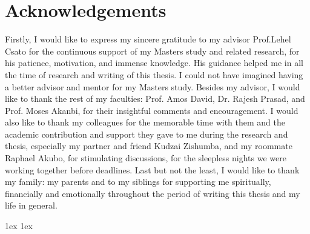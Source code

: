 \documentclass[final,book]{aust_thesis}
\begin{document}
\chapter*{Acknowledgements}%
\thispagestyle{empty}%
Firstly, I would like to express my sincere gratitude to my advisor Prof.Lehel Csato for the continuous support of my Masters study and related research, for his patience, motivation, and immense knowledge. His guidance helped me in all the time of research and writing of this thesis. I could not have imagined having a better advisor and mentor for my Masters study.
Besides my advisor, I would like to thank the rest of my faculties: Prof. Amos David, Dr. Rajesh Prasad, and Prof. Moses Akanbi, for their insightful comments and encouragement.
I would also like to thank my colleagues for the memorable time with them and the academic contribution and support they gave to me during the research and thesis, especially my partner and friend Kudzai Zishumba, and my roommate Raphael Akubo, for stimulating discussions, for the sleepless nights we were working together before deadlines.
Last but not the least, I would like to thank my family: my parents and to my siblings for supporting me spiritually, financially and emotionally throughout the period of writing this thesis and my life in general.

\clearpage
{ \baselineskip 1ex
  \parskip 1ex
  \tableofcontents
}


\listoffigures
\clearpage

\listofalgorithms
\clearpage










\appendix



{ 
	\renewcommand{\baselinestretch}{0.8}\normalsize %
	\setlength{\itemsep}{-2.4mm}
	\setlength{\bibspacing}{0.67\baselineskip}
	
	
}
\end{document}
